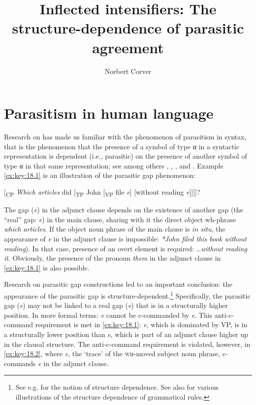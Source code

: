\documentclass[output=paper]{langsci/langscibook}
\author{Norbert Corver\affiliation{Utrecht Institute of Linguistics-OTS,
Utrecht University}}
\title{Inflected intensifiers: The structure-dependence of parasitic agreement}
\begin{document}
\glsresetall


\section{Parasitism in human language}

Research on  has made us familiar with the phenomenon of
parasitism in syntax, that is the phenomenon that the presence of a symbol of
type α in a syntactic representation is dependent (i.e., parasitic) on the
presence of another symbol of type α in that same representation; see among
others \textcite{Ross1967}, \textcite{Taraldsen1981}, \textcite{Chomsky1982},
and \textcite{Engdahl:1983}. Example \eqref{ex:key:18.1} is an illustration of the
parasitic gap phenomenon:

\ea%
    \label{ex:key:18.1}
    {}[\textsubscript{CP} \emph{Which articles} did [\textsubscript{TP} John
    [\textsubscript{VP} file \emph{e}\textsubscript{\Rg{}}] [without
    reading \emph{e}\textsubscript{\Pg{}}]]]]?
\z

The gap (\emph{e}\textsubscript{\Pg{}}) in the adjunct clause depends on the
existence of another gap (the \enquote{real} gap: \emph{e}\textsubscript{\Rg{}}) in the
main clause, sharing with it the direct object wh-phrase \emph{which articles}.
If the object noun phrase of the main clause is \emph{in situ}, the appearance
of \emph{e}\textsubscript{\Pg{}} in the adjunct clause is impossible:
\emph{*John filed this book without reading}). In that case, presence of an
overt element is required: \emph{\dots{}without reading it}. Obviously,
the presence of the pronoun \emph{them} in the adjunct clause in
\eqref{ex:key:18.1} is also possible.

Research on parasitic gap constructions led to an important conclusion: the
appearance of the parasitic gap is structure-dependent.\footnote{See e.g.
    \citet{Chomsky1975} for the notion of structure dependence. See also
    \citet{EveraertEtAl2015} for various illustrations of the structure
dependence of grammatical rules.} Specifically, the parasitic gap
(\emph{e}\textsubscript{\Pg{}}) may not be linked to a real gap
(\emph{e}\textsubscript{\Rg{}}) that is in a structurally higher position.  In
more formal terms: \emph{e}\textsubscript{\Pg{}} cannot be c-commanded by
\emph{e}\textsubscript{\Rg{}}. This anti-c-command requirement is met in
\eqref{ex:key:18.1}: \emph{e}\textsubscript{\Rg{}}, which is dominated by VP, is in
a structurally lower position than \emph{e}\textsubscript{\Pg{}}, which is part
of an adjunct clause higher up in the clausal structure. The anti-c-command
requirement is violated, however, in \eqref{ex:key:18.2}, where
\emph{e}\textsubscript{\Rg{}}, the \enquote*{trace} of the \textsc{wh}-moved subject
noun phrase, c-commands \emph{e}\textsubscript{\Pg{}} in the adjunct clause.
\end{document}
